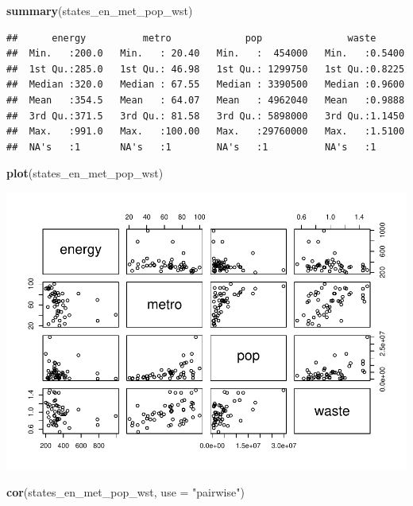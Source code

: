 \documentclass[
]{book}
\newenvironment{Shaded}{\begin{snugshade}}{\end{snugshade}}
\newcommand{\DataTypeTok}[1]{\textcolor[rgb]{0.13,0.29,0.53}{#1}}
\newcommand{\KeywordTok}[1]{\textcolor[rgb]{0.13,0.29,0.53}{\textbf{#1}}}
\newcommand{\NormalTok}[1]{#1}
\newcommand{\StringTok}[1]{\textcolor[rgb]{0.31,0.60,0.02}{#1}}
\begin{document}
\begin{alert}
\begin{Shaded}
\begin{Highlighting}[]
  \KeywordTok{summary}\NormalTok{(states\_en\_met\_pop\_wst)}
\end{Highlighting}
\end{Shaded}

\begin{verbatim}
##      energy          metro             pop               waste       
##  Min.   :200.0   Min.   : 20.40   Min.   :  454000   Min.   :0.5400  
##  1st Qu.:285.0   1st Qu.: 46.98   1st Qu.: 1299750   1st Qu.:0.8225  
##  Median :320.0   Median : 67.55   Median : 3390500   Median :0.9600  
##  Mean   :354.5   Mean   : 64.07   Mean   : 4962040   Mean   :0.9888  
##  3rd Qu.:371.5   3rd Qu.: 81.58   3rd Qu.: 5898000   3rd Qu.:1.1450  
##  Max.   :991.0   Max.   :100.00   Max.   :29760000   Max.   :1.5100  
##  NA's   :1       NA's   :1        NA's   :1          NA's   :1
\end{verbatim}

\begin{Shaded}
\begin{Highlighting}[]
  \KeywordTok{plot}\NormalTok{(states\_en\_met\_pop\_wst)}
\end{Highlighting}
\end{Shaded}

\includegraphics{R/Rmodels/figures/unnamed-chunk-103-1.pdf}

\begin{Shaded}
\begin{Highlighting}[]
  \KeywordTok{cor}\NormalTok{(states\_en\_met\_pop\_wst, }\DataTypeTok{use =} \StringTok{"pairwise"}\NormalTok{)}
\end{Highlighting}
\end{Shaded}


\end{alert}
\end{document}
